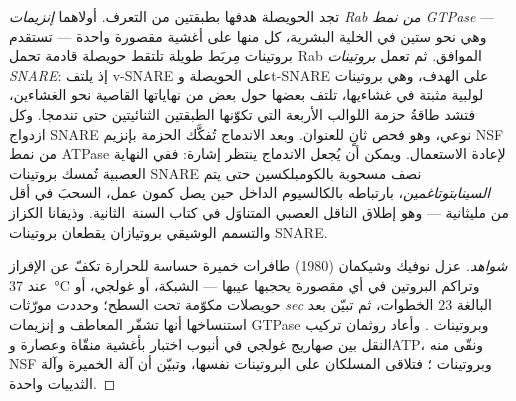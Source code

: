 \begin{definition}\label{def:b3:membrane-traffic:fusion}
تجد الحويصلة هدفها بطبقتين من التعرف. أولاهما \emph{إنزيمات
Rab من نمط GTPase} --- وهي نحو ستين في الخلية البشرية، كل منها على أغشية
مقصورة واحدة --- تستقدم بروتينات مِربَط طويلة تلتقط حويصلة
قادمة تحمل Rab الموافق. ثم تعمل \emph{بروتينات SNARE}: إذ يلتف
v-SNARE على الحويصلة وt-SNARE على الهدف، وهي بروتينات لولبية
مثبتة في غشاءيها، تلتف بعضها حول بعض من نهاياتها
القاصية نحو الغشاءين، فتشد طاقةُ حزمة اللوالب الأربعة التي
تكوّنها الطبقتين الثنائيتين حتى تندمجا. وكل ازدواج SNARE
نوعي، وهو فحص ثانٍ للعنوان. وبعد الاندماج تُفكَّك الحزمة
بإنزيم NSF من نمط ATPase لإعادة الاستعمال. ويمكن أن يُجعل الاندماج ينتظر
إشارة: ففي النهاية العصبية تُمسك بروتينات SNARE نصف مسحوبة
بالكومبلكسين حتى يتم \emph{السينابتوتاغمين}، بارتباطه بالكالسيوم الداخل حين
يصل كمون عمل، السحبَ في أقل من
مليثانية --- وهو إطلاق الناقل العصبي المتناوَل في كتاب السنة~الثانية.
وذيفانا الكزاز والتسمم الوشيقي بروتيازان يقطعان
بروتينات SNARE.
\end{definition}

\begin{proof}[شواهد]
عزل نوفيك وشيكمان (1980) طافرات خميرة حساسة للحرارة
تكفّ عن الإفراز عند \qty{37}{\celsius} وتراكم
البروتين في أي مقصورة يحجبها عيبها --- الشبكة،
أو غولجي، أو حويصلات مكوّمة تحت السطح؛ وحددت مورّثات \emph{sec} البالغة $23$
الخطوات، ثم تبيّن بعد استنساخها أنها تشفّر المعاطف و
إنزيمات GTPase وبروتينات . وأعاد روثمان تركيب النقل بين صهاريج
غولجي في أنبوب اختبار بأغشية منقّاة وعصارة وATP،
ونقّى منه NSF وبروتينات ؛ فتلاقى المسلكان
على البروتينات نفسها، وتبيّن أن آلة الخميرة وآلة الثدييات
واحدة.
\end{proof}

